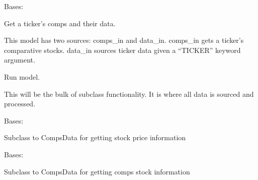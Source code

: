 \documentclass[letterpaper,10pt,english]{sphinxmanual}
\begin{document}
\begin{fulllineitems}
\label{\detokenize{dalio.model:dalio.model.financial.CompsData}}
Bases: {\hyperref[\detokenize{dalio.model:dalio.model.model.Model}]{}}

Get a ticker’s comps and their data.

This model has two sources: comps\_in and data\_in. comps\_in gets a
ticker’s comparative stocks. data\_in sources ticker data given a “TICKER”
keyword argument.

\begin{fulllineitems}
\label{\detokenize{dalio.model:dalio.model.financial.CompsData.run}}
Run model.

This will be the bulk of subclass functionality. It is where all
data is sourced and processed.

\end{fulllineitems}


\end{fulllineitems}


\begin{fulllineitems}
\label{\detokenize{dalio.model:dalio.model.financial.CompsFinancials}}
Bases: {\hyperref[\detokenize{dalio.model:dalio.model.financial.CompsData}]{}}

Subclass to CompsData for getting stock price information

\end{fulllineitems}


\begin{fulllineitems}
\label{\detokenize{dalio.model:dalio.model.financial.CompsInfo}}
Bases: {\hyperref[\detokenize{dalio.model:dalio.model.financial.CompsData}]{}}

Subclass to CompsData for getting comps stock information

\end{fulllineitems}
\end{document}
